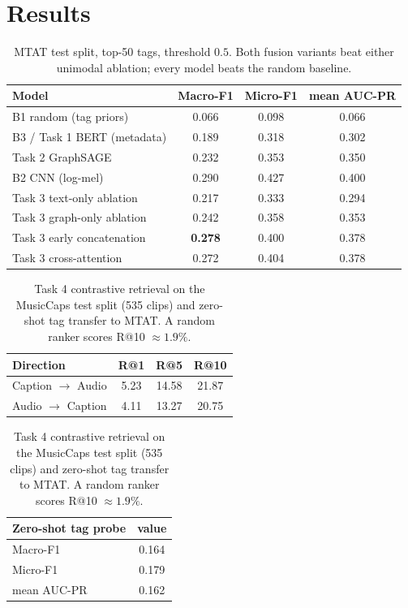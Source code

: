 \documentclass{article}
\begin{document}
\section{Results}

\begin{table}[t]
  \centering
  \caption{MTAT test split, top-50 tags, threshold $0.5$. Both fusion variants
  beat either unimodal ablation; every model beats the random baseline.}
  \label{tab:main}
  \begin{tabular}{lccc}
    \toprule
    Model & Macro-F1 & Micro-F1 & mean AUC-PR \\
    \midrule
    B1 random (tag priors)      & 0.066 & 0.098 & 0.066 \\
    B3 / Task 1 BERT (metadata) & 0.189 & 0.318 & 0.302 \\
    Task 2 GraphSAGE            & 0.232 & 0.353 & 0.350 \\
    B2 CNN (log-mel)            & 0.290 & 0.427 & 0.400 \\
    \midrule
    Task 3 text-only ablation   & 0.217 & 0.333 & 0.294 \\
    Task 3 graph-only ablation  & 0.242 & 0.358 & 0.353 \\
    Task 3 early concatenation  & \textbf{0.278} & 0.400 & 0.378 \\
    Task 3 cross-attention      & 0.272 & 0.404 & 0.378 \\
    \bottomrule
  \end{tabular}
\end{table}

\begin{table}[t]
  \centering
  \caption{Task 4 contrastive retrieval on the MusicCaps test split (535 clips)
  and zero-shot tag transfer to MTAT. A random ranker scores R@10 $\approx
  1.9\%$.}
  \label{tab:retrieval}
  \begin{tabular}{lccc}
    \toprule
    Direction & R@1 & R@5 & R@10 \\
    \midrule
    Caption $\rightarrow$ Audio & 5.23 & 14.58 & 21.87 \\
    Audio $\rightarrow$ Caption & 4.11 & 13.27 & 20.75 \\
    \bottomrule
  \end{tabular}
  \quad
  \begin{tabular}{lc}
    \toprule
    Zero-shot tag probe & value \\
    \midrule
    Macro-F1 & 0.164 \\
    Micro-F1 & 0.179 \\
    mean AUC-PR & 0.162 \\
    \bottomrule
  \end{tabular}
\end{table}
\end{document}
